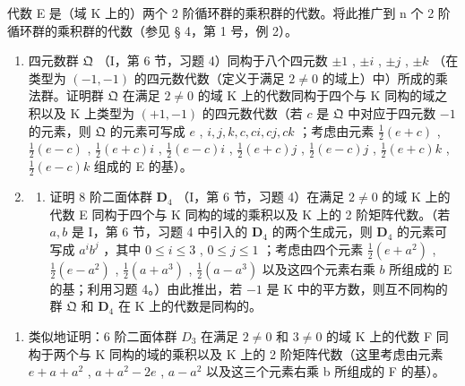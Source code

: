 代数 E 是（域 K 上的）两个 2 阶循环群的乘积群的代数。将此推广到 n 个 2 阶循环群的乘积群的代数（参见 § 4，第 1 号，例 2）。

\begin{enumerate}
\def\labelenumi{\arabic{enumi}.}
\setcounter{enumi}{7}
\item
  四元数群 \(\mathfrak{Q}\) （I，第 6 节，习题 4）同构于八个四元数 \(\pm 1\) , \(\pm i\) , \(\pm j\) , \(\pm k\) （在类型为 \((-1, -1)\) 的四元数代数（定义于满足 \(2 \neq 0\) 的域上）中）所成的乘法群。证明群 \(\mathfrak{Q}\) 在满足 \(2 \neq 0\) 的域 K 上的代数同构于四个与 K 同构的域之积以及 K 上类型为 \((+1, -1)\) 的四元数代数（若 \(c\) 是 \(\mathfrak{Q}\) 中对应于四元数 \(-1\) 的元素，则 \(\mathfrak{Q}\) 的元素可写成 \(e\) , \(i, j, k, c, ci, cj, ck\) ；考虑由元素 \(\frac{1}{2}(e + c)\) , \(\frac{1}{2}(e - c)\) , \(\frac{1}{2}(e + c)i\) , \(\frac{1}{2}(e - c)i\) , \(\frac{1}{2}(e + c)j\) , \(\frac{1}{2}(e - c)j\) , \(\frac{1}{2}(e + c)k\) , \(\frac{1}{2}(e - c)k\) 组成的 E 的基）。
\item
  \begin{enumerate}
  \def\labelenumii{(\alph{enumii})}
  \tightlist
  \item
    证明 8 阶二面体群 \(\mathbf{D}_4\) （I，第 6 节，习题 4）在满足 \(2 \neq 0\) 的域 K 上的代数 E 同构于四个与 K 同构的域的乘积以及 K 上的 2 阶矩阵代数。（若 \(a, b\) 是 I，第 6 节，习题 4 中引入的 \(\mathbf{D}_4\) 的两个生成元，则 \(\mathbf{D}_4\) 的元素可写成 \(a^i b^j\) ，其中 \(0 \leqslant i \leqslant 3\) , \(0 \leqslant j \leqslant 1\) ；考虑由四个元素 \(\frac{1}{2}(e + a^2)\) , \(\frac{1}{2}(e - a^2)\) , \(\frac{1}{2}(a + a^3)\) , \(\frac{1}{2}(a - a^3)\) 以及这四个元素右乘 \(b\) 所组成的 E 的基；利用习题 4。）由此推出，若 \(-1\) 是 K 中的平方数，则互不同构的群 \(\mathfrak{Q}\) 和 \(\mathbf{D}_4\) 在 K 上的代数是同构的。
  \end{enumerate}
\end{enumerate}

\begin{enumerate}
\def\labelenumi{(\alph{enumi})}
\setcounter{enumi}{1}
\tightlist
\item
  类似地证明：6 阶二面体群 \(D_{3}\) 在满足 \(2 \neq 0\) 和 \(3 \neq 0\) 的域 K 上的代数 F 同构于两个与 K 同构的域的乘积以及 K 上的 2 阶矩阵代数（这里考虑由元素 \(e + a + a^{2}\) , \(a + a^{2} - 2e\) , \(a - a^{2}\) 以及这三个元素右乘 b 所组成的 F 的基）。
\end{enumerate}

